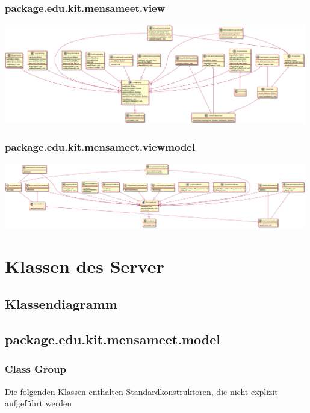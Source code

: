 \documentclass[a4paper]{scrreprt}
\begin{document}
\newpage

\subsubsection{package.edu.kit.mensameet.view}
\begin{center}
	\includegraphics[width=0.99\textwidth]{GUI/frontend_view.png}
\end{center}


\newpage
\subsubsection{package.edu.kit.mensameet.viewmodel}
\begin{center}
	\includegraphics[width=0.99\textwidth]{GUI/frontend_viewmodel.png}
\end{center}

\section{Klassen des Server}
\subsection{Klassendiagramm}

\subsection{package.edu.kit.mensameet.model}
\subsubsection{Class Group}
Die folgenden Klassen enthalten Standardkonstruktoren, die nicht explizit aufgeführt werden
\end{document}
